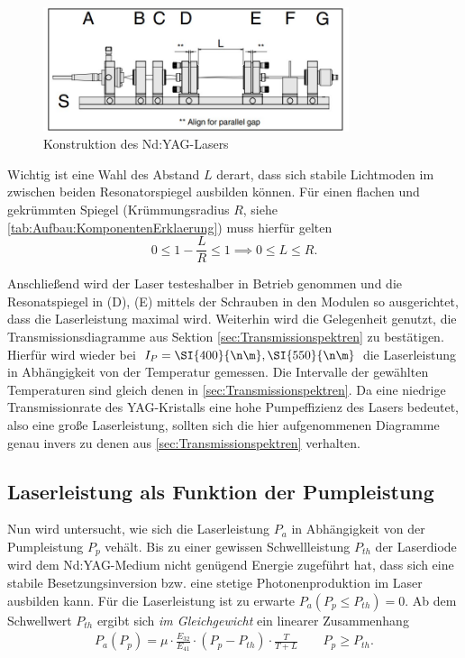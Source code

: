 \documentclass[../main.tex]{subfiles}
\begin{document}
        \begin{figure}[H]
            \centering
            \includegraphics[width=0.8\textwidth]{Bilddateien/Versuchsaufbau/Teil4.jpg}
            \caption{Konstruktion des Nd:YAG-Lasers}
            \label{fig:Aufbau:Teil4}
        \end{figure}    

        Wichtig ist eine Wahl des Abstand $L$ derart, dass sich stabile Lichtmoden im zwischen beiden Resonatorspiegel ausbilden können. Für einen flachen und gekrümmten Spiegel (Krümmungsradius $R$, siehe \ref{tab:Aufbau:KomponentenErklaerung}) muss hierfür gelten 
        \[
            0\le 1 - \frac{L}{R}\le 1\implies 0\le L\le R.    
        \]

        Anschließend wird der Laser testeshalber in Betrieb genommen und die Resonatspiegel in (D), (E) mittels der Schrauben in den Modulen so ausgerichtet, dass die Laserleistung maximal wird. Weiterhin wird die Gelegenheit genutzt, die Transmissionsdiagramme aus Sektion \ref{sec:Transmissionspektren} zu bestätigen. Hierfür wird wieder bei $I_P = \SI{400}{\n\m}, \SI{550}{\n\m}$ die Laserleistung in Abhängigkeit von der Temperatur gemessen. Die Intervalle der gewählten Temperaturen sind gleich denen in \ref{sec:Transmissionspektren}. Da eine niedrige Transmissionrate des YAG-Kristalls eine hohe Pumpeffizienz des Lasers bedeutet, also eine große Laserleistung, sollten sich die hier aufgenommenen Diagramme genau invers zu denen aus \ref{sec:Transmissionspektren} verhalten.

    \subsection{Laserleistung als Funktion der Pumpleistung}
        Nun wird untersucht, wie sich die Laserleistung $P_a$ in Abhängigkeit von der Pumpleistung $P_p$ vehält. Bis zu einer gewissen Schwellleistung $P_{th}$ der Laserdiode wird dem Nd:YAG-Medium nicht genügend Energie zugeführt hat, dass sich eine stabile Besetzungsinversion bzw. eine stetige Photonenproduktion im Laser ausbilden kann. Für die Laserleistung ist zu erwarte $P_a(P_p\le P_{th}) = 0$. Ab dem Schwellwert $P_{th}$ ergibt sich \textit{im Gleichgewicht} ein linearer Zusammenhang
        \begin{align*}
            P_a(P_p) = \mu\cdot \frac{E_{32}}{E_{41}}\cdot (P_p - P_{th})\cdot\frac{T}{T + L}\qquad P_p\ge P_{th}.    
            \label{eq:Grundlagen:Pumpleistung}
        \end{align*}
\end{document}
